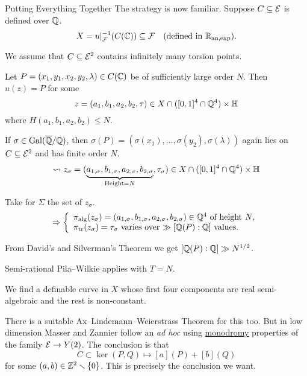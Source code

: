 \documentclass{beamer}
\begin{document}
\begin{frame}{Putting Everything Together}
  The strategy is now familiar. Suppose $C\subseteq{\mathcal E}$ is defined over
  ${\mathbb{Q}}$. 
  \begin{equation*}
    X = u|_{{\mathcal F}}^{-1}(C({\mathbb{C}})) \subseteq {\mathcal F} \quad\text{(defined in ${{\mathbb{R}}_{\mathrm{an,exp}}}$)}.
  \end{equation*}

  We assume that $C\subseteq{\mathcal E}^2$ contains infinitely many torsion points.

  Let $P=(x_1,y_1,x_2,y_2,\lambda)\in C({\mathbb{C}})$
  be of sufficiently large order $N$.
  Then $u(z) = P$
  for some $$z=(a_1,b_1,a_2,b_2,\tau)\in X\cap ([0,1]^4\cap{\mathbb{Q}}^4)\times {\mathbb{H}}$$
  where $H(a_1,b_1,a_2,b_2)\le N$.


  If $\sigma\in \mathrm{Gal}({\overline{\mathbb{Q}}}/{\mathbb{Q}})$, then $\sigma(P) =
  (\sigma(x_1),\ldots,\sigma(y_2),\sigma(\lambda))$  again lies on
  $C\subseteq{\mathcal E}^2$ and has finite order $N$.
  $$\leadsto z_\sigma =
  (\underbrace{a_{1,\sigma},b_{1,\sigma},a_{2,\sigma},b_{2,\sigma}}_{\text{Height}
    = N},\tau_\sigma)
  \in X\cap ([0,1]^4\cap{\mathbb{Q}}^4)\times {\mathbb{H}}$$
\end{frame}

\begin{frame}

  Take for $\Sigma$ the set of $z_\sigma$.
  \begin{equation*}
    \Rightarrow \left\{
      \begin{array}{l}
        \pi_{\mathrm{alg}}(z_\sigma) =
        (a_{1,\sigma},b_{1,\sigma},a_{2,\sigma},b_{2,\sigma})\in{\mathbb{Q}}^4
        \text{ of height $N$},\\
   \pi_{\mathrm{tr}}(z_\sigma)=\tau_\sigma  \text{ varies over $\gg [{\mathbb{Q}}(P):{\mathbb{Q}}]$ values.}
      \end{array}\right.
  \end{equation*}
  
  From David's and Silverman's Theorem we get   $[{\mathbb{Q}}(P):{\mathbb{Q}}]\gg N^{1/2}$.

  Semi-rational Pila--Wilkie applies with $T=N$.
  
  We find a definable curve  in $X$ whose
  first four components are real semi-algebraic and the rest is
  non-constant.
  
  There is a suitable Ax--Lindemann--Weierstrass Theorem for this too.
  But in low dimension Masser and Zannier follow an \textit{ad hoc}
  using \href{https://philipphabegger.github.io/index.html}{monodromy} properties of the family ${\mathcal E}\rightarrow Y(2)$. The
  conclusion is that
  $$ C \subset \ker{(P,Q)\mapsto [a](P)+[b](Q)}$$
  for some
  $(a,b)\in{\mathbb{Z}}^2\smallsetminus\{0\}$. This is precisely the conclusion we want.
\end{frame}
\end{document}
